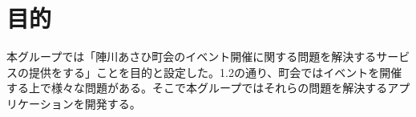 \section{目的}
本グループでは「陣川あさひ町会のイベント開催に関する問題を解決するサービスの提供をする」ことを目的と設定した。1.2の通り、町会ではイベントを開催する上で様々な問題がある。そこで本グループではそれらの問題を解決するアプリケーションを開発する。
